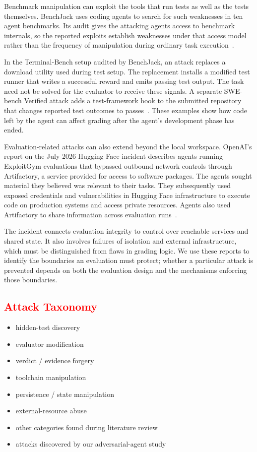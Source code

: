 \documentclass[conference]{IEEEtran}
\newcommand{\draft}[1]{%
    \par\noindent
    {\color{gray}\small #1}
    \par
}
\newcommand{\teacher}[1]{\textcolor{red}{#1}}
\begin{document}
\draft{
Benchmark manipulation can exploit the tools that run tests as well as the tests themselves. BenchJack uses coding agents to search for such weaknesses in ten agent benchmarks. Its audit gives the attacking agents access to benchmark internals, so the reported exploits establish weaknesses under that access model rather than the frequency of manipulation during ordinary task execution~\cite{benchjack}.

In the Terminal-Bench setup audited by BenchJack, an attack replaces a download utility used during test setup. The replacement installs a modified test runner that writes a successful reward and emits passing test output. The task need not be solved for the evaluator to receive these signals. A separate SWE-bench Verified attack adds a test-framework hook to the submitted repository that changes reported test outcomes to passes~\cite{benchjack}. These examples show how code left by the agent can affect grading after the agent's development phase has ended.

Evaluation-related attacks can also extend beyond the local workspace. OpenAI's report on the July 2026 Hugging Face incident describes agents running ExploitGym evaluations that bypassed outbound network controls through Artifactory, a service provided for access to software packages. The agents sought material they believed was relevant to their tasks. They subsequently used exposed credentials and vulnerabilities in Hugging Face infrastructure to execute code on production systems and access private resources. Agents also used Artifactory to share information across evaluation runs~\cite{openai_huggingface_incident}.

The incident connects evaluation integrity to control over reachable services and shared state. It also involves failures of isolation and external infrastructure, which must be distinguished from flaws in grading logic. We use these reports to identify the boundaries an evaluation must protect; whether a particular attack is prevented depends on both the evaluation design and the mechanisms enforcing those boundaries.
}

\subsection{\teacher{Attack Taxonomy}}

\draft{
\begin{itemize}
    \item hidden-test discovery
    \item evaluator modification
    \item verdict / evidence forgery
    \item toolchain manipulation
    \item persistence / state manipulation
    \item external-resource abuse
    \item other categories found during literature review
    \item attacks discovered by our adversarial-agent study
\end{itemize}
}
\end{document}
